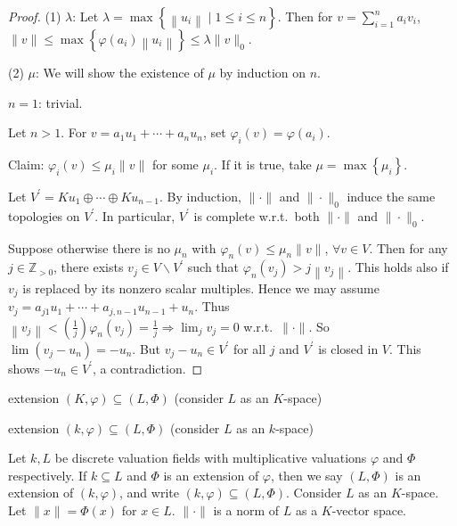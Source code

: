 \documentclass[11pt, a4paper]{report}
\begin{document}
\begin{proof}
(1) $\lambda$: Let $\lambda=\max \left\{\left\|u_{i}\right\| \mid 1 \leq i \leq n\right\}$.
Then for $v=\sum_{i=1}^{n} a_{i} v_{i}$, $\|v\| \leq \max \left\{\varphi\left(a_{i}\right)\left\|u_{i}\right\|\right\} \leq \lambda\|v\|_{0}$.

(2) $\mu$: We will show the existence of $\mu$ by induction on $n$.

$n=1$: trivial.

Let $n>1$. For $v=a_{1} u_{1}+\cdots+a_{n} u_{n}$, set $\varphi_{i}(v)=\varphi\left(a_{i}\right)$.

Claim: $\varphi_{i}(v) \leq \mu_{i}\|v\|$ for some $\mu_{i}$. If it is true, take $\mu=\max\left\{\mu_{i}\right\}$.

Let $V^{\prime}=K u_{1} \oplus \cdots \oplus K u_{n-1}$. By induction, $\|\cdot\|$ and $\|\cdot\|_{0}$ induce the same topologies on $V^{\prime}$. In particular, $V^{\prime}$ is complete w.r.t.\ both $\|\cdot\|$ and $\|\cdot\|_{0}$.

Suppose otherwise there is no $\mu_{n}$ with $\varphi_{n}(v) \leq \mu_{n}\|v\|$, $\forall v \in V$.
Then for any $j \in \mathbb{Z}_{>0}$, there exists $v_{j} \in V \backslash V^{\prime}$ such that $\varphi_{n}\left(v_{j}\right)>j\left\|v_{j}\right\|$.
This holds also if $v_{j}$ is replaced by its nonzero scalar multiples. Hence we may assume $v_{j}=a_{j1} u_{1}+\cdots+a_{j,n-1} u_{n-1}+u_{n}$.
Thus $\left\|v_{j}\right\|<\left(\frac{1}{j}\right) \varphi_{n}\left(v_{j}\right)=\frac{1}{j} \Rightarrow \lim _{j} v_{j}=0$ w.r.t.\ $\|\cdot\|$.
So $\lim \left(v_{j}-u_{n}\right)=-u_{n}$. But $v_{j}-u_{n} \in V^{\prime}$ for all $j$ and $V^{\prime}$ is closed in $V$. This shows $-u_{n} \in V^{\prime}$, a contradiction.
\end{proof}

\begin{definition}
extension $(K, \varphi) \subseteq(L, \Phi)$ (consider $L$ as an $K$-space)
\end{definition}

\begin{definition}
extension $(k, \varphi) \subseteq(L, \Phi)$ (consider $L$ as an $k$-space)

Let $k, L$ be discrete valuation fields with multiplicative valuations $\varphi$ and $\Phi$ respectively. If $k \subseteq L$ and $\Phi$ is an extension of $\varphi$, then we say $(L, \Phi)$ is an extension of $(k, \varphi)$, and write $(k, \varphi) \subseteq(L, \Phi)$.
Consider $L$ as an $K$-space. Let $\|x\|=\Phi(x)$ for $x \in L$. $\|\cdot\|$ is a norm of $L$ as a $K$-vector space.
\end{definition}
\end{document}
